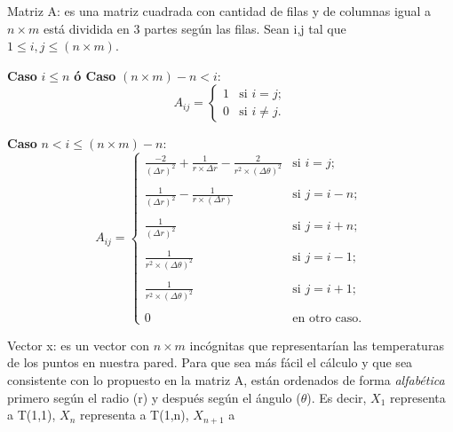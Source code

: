 \begin{compactitem}
  \item Matriz A: es una matriz cuadrada con cantidad de filas y de columnas igual a $n \times m$ 
  	está dividida en 3 partes según las filas.  Sean i,j tal que $1 \leq i,j \leq (n \times m)$. \\
  	\begin{compactitem}
	  \item \textbf{Caso} $i \leq n$ \textbf{ó Caso} $(n \times m) - n < i$:
	    \[ A_{ij} = \left\{ \begin{array}{ll}
               1 & \mbox{si $i = j$};\\
	       0 & \mbox{si $i \neq j$}.\end{array} \right. \] 
          \item \textbf{Caso} $n < i \leq (n \times m) - n$:
	    \[ A_{ij} = \left\{ \begin{array}{ll}
               \frac{-2}{(\Delta r)^2} + \frac{1}{r \times \Delta r} - \frac{2}{r^2 \times (\Delta \theta)^2}& \mbox{si $i = j$};\\ \ \\
               \frac{1}{(\Delta r)^2} - \frac{1}{r \times (\Delta r)}                                        & \mbox{si $j = i-n$};\\ \ \\
               \frac{1}{(\Delta r)^2}                                                                        & \mbox{si $j = i+n$};\\ \ \\
               \frac{1}{r^2 \times (\Delta \theta)^2}                                                        & \mbox{si $j = i-1$};\\ \ \\
               \frac{1}{r^2 \times (\Delta \theta)^2}                                                        & \mbox{si $j = i+1$};\\ \ \\
	       0 & \mbox{en otro caso}.\end{array} \right. \] 
	\end{compactitem}
 \item Vector x: es un vector con $n \times m$ incógnitas que representarían las temperaturas de los
 puntos en nuestra pared. Para que sea más fácil el cálculo y que sea consistente con lo propuesto
 en la matriz A, están ordenados de forma \textit{alfabética} primero según el radio (r) y después según
 el ángulo ($\theta$). Es decir, $X_1$ representa a T(1,1), $X_n$ representa a T(1,n), $X_{n+1}$ a

\end{compactitem}
